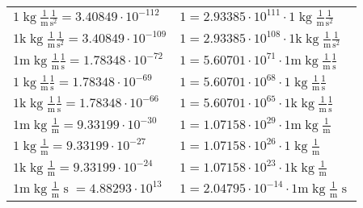 \begin{center}
\begin{longtable}{l l}
{\color{black}$1 \bm{\mathrm{ }}\operatorname{kg}\frac1{\operatorname{m}}\frac1{\operatorname{s}^2}{}{} = 3.40849\cdot10^{-112} $}   & {\color{black}$ 1 = 2.93385\cdot10^{111} \cdot 1 \bm{\mathrm{ }}\operatorname{kg}\frac1{\operatorname{m}}\frac1{\operatorname{s}^2}{}{}$}  \\
{\color{gray}$1 \bm{\mathrm{ k}}\operatorname{kg}\frac1{\operatorname{m}}\frac1{\operatorname{s}^2}{}{} = 3.40849\cdot10^{-109} $}   & {\color{gray}$ 1 = 2.93385\cdot10^{108} \cdot 1 \bm{\mathrm{ k}}\operatorname{kg}\frac1{\operatorname{m}}\frac1{\operatorname{s}^2}{}{}$}  \\
{\color{gray}$1 \bm{\mathrm{ m}}\operatorname{kg}\frac1{\operatorname{m}}\frac1{\operatorname{s}}{}{} = 1.78348\cdot10^{-72} $}   & {\color{gray}$ 1 = 5.60701\cdot10^{71} \cdot 1 \bm{\mathrm{ m}}\operatorname{kg}\frac1{\operatorname{m}}\frac1{\operatorname{s}}{}{}$}  \\
{\color{black}$1 \bm{\mathrm{ }}\operatorname{kg}\frac1{\operatorname{m}}\frac1{\operatorname{s}}{}{} = 1.78348\cdot10^{-69} $}   & {\color{black}$ 1 = 5.60701\cdot10^{68} \cdot 1 \bm{\mathrm{ }}\operatorname{kg}\frac1{\operatorname{m}}\frac1{\operatorname{s}}{}{}$}  \\
{\color{gray}$1 \bm{\mathrm{ k}}\operatorname{kg}\frac1{\operatorname{m}}\frac1{\operatorname{s}}{}{} = 1.78348\cdot10^{-66} $}   & {\color{gray}$ 1 = 5.60701\cdot10^{65} \cdot 1 \bm{\mathrm{ k}}\operatorname{kg}\frac1{\operatorname{m}}\frac1{\operatorname{s}}{}{}$}  \\
{\color{gray}$1 \bm{\mathrm{ m}}\operatorname{kg}\frac1{\operatorname{m}}{}{}{} = 9.33199\cdot10^{-30} $}   & {\color{gray}$ 1 = 1.07158\cdot10^{29} \cdot 1 \bm{\mathrm{ m}}\operatorname{kg}\frac1{\operatorname{m}}{}{}{}$}  \\
{\color{black}$1 \bm{\mathrm{ }}\operatorname{kg}\frac1{\operatorname{m}}{}{}{} = 9.33199\cdot10^{-27} $}   & {\color{black}$ 1 = 1.07158\cdot10^{26} \cdot 1 \bm{\mathrm{ }}\operatorname{kg}\frac1{\operatorname{m}}{}{}{}$}  \\
{\color{gray}$1 \bm{\mathrm{ k}}\operatorname{kg}\frac1{\operatorname{m}}{}{}{} = 9.33199\cdot10^{-24} $}   & {\color{gray}$ 1 = 1.07158\cdot10^{23} \cdot 1 \bm{\mathrm{ k}}\operatorname{kg}\frac1{\operatorname{m}}{}{}{}$}  \\
{\color{gray}$1 \bm{\mathrm{ m}}\operatorname{kg}\frac1{\operatorname{m}}{\operatorname{s}}{}{} = 4.88293\cdot10^{13} $}   & {\color{gray}$ 1 = 2.04795\cdot10^{-14} \cdot 1 \bm{\mathrm{ m}}\operatorname{kg}\frac1{\operatorname{m}}{\operatorname{s}}{}{}$}  \\

\end{longtable}
\end{center}

